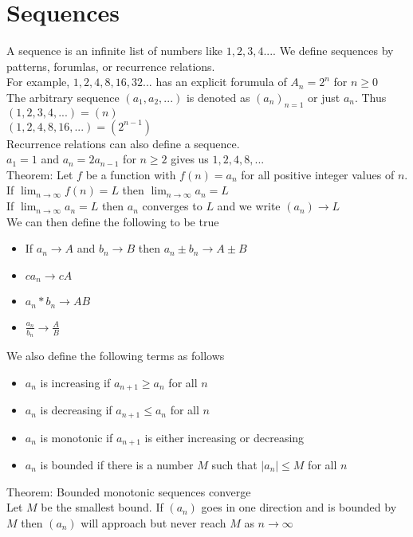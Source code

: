 \documentclass{article}
\begin{document}
\section{Sequences}
A sequence is an infinite list of numbers like $1, 2, 3, 4 ...$. We define sequences by patterns, forumlas, or recurrence relations.\\
For example, $1, 2, 4, 8, 16, 32 ...$ has an explicit forumula of $A_n = 2^n$ for $n \geq 0$\\
The arbitrary sequence $(a_1, a_2, ...)$ is denoted as $(a_n)_{n=1}$ or just $a_n$. Thus\\
$(1, 2, 3, 4, ...) = (n)$\\
$(1, 2, 4, 8, 16, ...) = (2^{n-1})$\\
Recurrence relations can also define a sequence.\\
$a_1 = 1$ and $a_n = 2a_{n-1}$ for $n \geq 2$ gives us $1, 2, 4, 8, ...$\\
Theorem: Let $f$ be a function with $f(n) = a_n$ for all positive integer values of $n$. If $\lim_{n \to \infty} f(n) = L$ then $\lim_{n \to \infty} a_n = L$\\
If $\lim_{n \to \infty} a_n = L$ then $a_n$ converges to $L$ and we write $(a_n) \to L$\\
We can then define the following to be true
\begin{itemize}
  \item If $a_n \to A$ and $b_n \to B$ then $a_n \pm b_n \to A \pm B$
  \item $ca_n \to cA$
  \item $a_n * b_n \to AB$
  \item $\frac{a_n}{b_n} \to \frac{A}{B}$
\end{itemize}

We also define the following terms as follows
\begin{itemize}
  \item $a_n$ is increasing if $a_{n+1} \geq a_n$ for all $n$
  \item $a_n$ is decreasing if $a_{n+1} \leq a_n$ for all $n$
  \item $a_n$ is monotonic if $a_{n+1}$ is either increasing or decreasing
  \item $a_n$ is bounded if there is a number $M$ such that $|a_n| \leq M$ for all $n$
\end{itemize}

Theorem: Bounded monotonic sequences converge\\
Let $M$ be the smallest bound. If $(a_n)$ goes in one direction and is bounded by $M$ then $(a_n)$ will approach but never reach $M$ as $n \to \infty$
\end{document}
